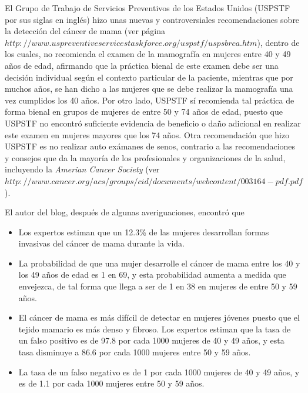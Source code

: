 \documentclass[10pt,openright]{book}\usepackage[]{graphicx}\usepackage[]{color}
\begin{document}
\begin{Eje}
El Grupo de Trabajo de Servicios Preventivos de los Estados Unidos (USPSTF por sus siglas en inglés) hizo unas nuevas y controversiales recomendaciones sobre la detección del cáncer de mama (ver página $http://www.uspreventiveservicestaskforce.org/uspstf/uspsbrca.htm$), dentro de los cuales, no recomienda el examen de la mamografía en mujeres entre 40 y 49 años de edad, afirmando que la práctica bienal de este examen debe ser una decisión individual según el contexto particular de la paciente, mientras que por muchos años, se han dicho a las mujeres que se debe realizar la mamografía una vez cumplidos los 40 años. Por otro lado, USPSTF sí recomienda tal práctica de forma bienal en grupos de mujeres de entre 50 y 74 años de edad, puesto que USPSTF no encontró suficiente evidencia de beneficio o daño adicional en realizar este examen en mujeres mayores que los 74 años. Otra recomendación que hizo USPSTF es no realizar auto exámanes de senos, contrario a las recomendaciones y consejos que da la mayoría de los profesionales y organizaciones de la salud, incluyendo la \emph{Amerian Cancer Society} (ver $http://www.cancer.org/acs/groups/cid/documents/webcontent/003164-pdf.pdf$).

El autor del blog, después de algunas averiguaciones, encontró que 
\begin{itemize}
    \item Los expertos estiman que un 12.3\% de las mujeres desarrollan formas invasivas del cáncer de mama durante la vida.
    \item La probabilidad de que una mujer desarrolle el cáncer de mama entre los 40 y los 49 años de edad es 1 en 69, y esta probabilidad aumenta a medida que envejezca, de tal forma que llega a ser de 1 en 38 en mujeres de entre 50 y 59 años.
    \item El cáncer de mama es más difícil de detectar en mujeres jóvenes puesto que el tejido mamario es más denso y fibroso. Los expertos estiman que la tasa de un falso positivo es de 97.8 por cada 1000 mujeres de 40 y 49 años, y esta tasa disminuye a 86.6 por cada 1000 mujeres entre 50 y 59 años. 
    \item La tasa de un falso negativo es de 1 por cada 1000 mujeres de 40 y 49 años, y es de 1.1 por cada 1000 mujeres entre 50 y 59 años.
\end{itemize}


\end{Eje}
\end{document}
